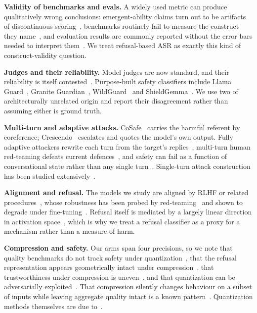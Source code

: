 \documentclass{article}
\begin{document}
\textbf{Validity of benchmarks and evals.} A widely used metric can produce
qualitatively wrong conclusions: emergent-ability claims turn out to be artifacts of
discontinuous scoring~\citep{schaeffer2023emergent}, benchmarks routinely fail to
measure the construct they name~\citep{raji2021everything}, and evaluation results are
commonly reported without the error bars needed to interpret
them~\citep{miller2024error}. We treat refusal-based ASR as exactly this kind of
construct-validity question.

\textbf{Judges and their reliability.} Model judges are now standard, and their
reliability is itself contested~\citep{zheng2023judging}. Purpose-built safety
classifiers include Llama Guard~\citep{inan2023llamaguard}, Granite
Guardian~\citep{padhi2024granite}, WildGuard~\citep{han2024wildguard} and
ShieldGemma~\citep{zeng2024shieldgemma}. We use two of architecturally unrelated
origin and report their disagreement rather than assuming either is ground truth.

\textbf{Multi-turn and adaptive attacks.} CoSafe~\citep{yu2024cosafe} carries the
harmful referent by coreference; Crescendo~\citep{russinovich2024crescendo} escalates
and quotes the model's own output. Fully adaptive attackers rewrite each turn from
the target's replies~\citep{chao2023jailbreaking,mehrotra2024tree,andriushchenko2024jailbreaking,ren2024actorattack},
multi-turn human red-teaming defeats current defences~\citep{li2024multiturn,yang2024chainofattack},
and safety can fail as a function of conversational state rather than any single
turn~\citep{star2026state}. Single-turn attack construction has been studied
extensively~\citep{zou2023universal,liu2024autodan,wei2023jailbroken}.

\textbf{Alignment and refusal.} The models we study are aligned by RLHF or related
procedures~\citep{ouyang2022training,bai2022constitutional}, whose robustness has been
probed by red-teaming~\citep{ganguli2022red,perez2022red} and shown to degrade under
fine-tuning~\citep{qi2024finetuning}. Refusal itself is mediated by a largely linear
direction in activation space~\citep{arditi2024refusal,zou2023representation}, which is
why we treat a refusal classifier as a proxy for a mechanism rather than a measure of
harm.

\textbf{Compression and safety.} Our arms span four precisions, so we note that
quality benchmarks do not track safety under
quantization~\citep{kadadekar2026quality}, that the refusal representation appears
geometrically intact under compression~\citep{chhabra2025refusal}, that
trustworthiness under compression is uneven~\citep{hong2024decoding}, and that
quantization can be adversarially exploited~\citep{egashira2024exploiting}. That
compression silently changes behaviour on a subset of inputs while leaving aggregate
quality intact is a known
pattern~\citep{hooker2019compressed,hooker2020characterising}. Quantization methods
themselves are due to~\citep{frantar2023gptq,lin2024awq,dettmers2023qlora,dettmers2022llmint8,xiao2023smoothquant}.
\end{document}
